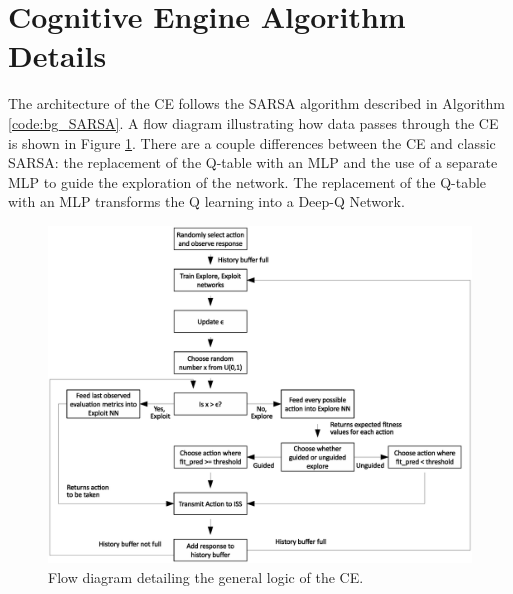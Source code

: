 \section{Cognitive Engine Algorithm Details}
\par The architecture of the CE follows the SARSA algorithm described in Algorithm \ref{code:bg_SARSA}. A flow diagram illustrating how data passes through the CE is shown in Figure \ref{fig:ceDataFlow}. There are a couple differences between the CE and classic SARSA: the replacement of the Q-table with an MLP and the use of a separate MLP to guide the exploration of the network. The replacement of the Q-table with an MLP transforms the Q learning into a Deep-Q Network.
\begin{landscape}
\begin{figure}[ht]
\includegraphics[width=\paperwidth]{figures/rough_flow_diagram.eps}
\caption{Flow diagram detailing the general logic of the CE.}\label{fig:ceDataFlow}
\end{figure}
\end{landscape}
